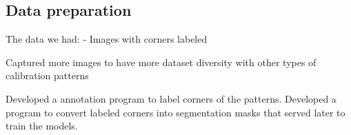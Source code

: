 \subsection{Data preparation}

The data we had:
  -  Images with corners labeled

Captured more images to have more dataset diversity with other types of calibration patterns

Developed a annotation program to label corners of the patterns. 
Developed a program to convert labeled corners into segmentation masks that served later to train the models.
